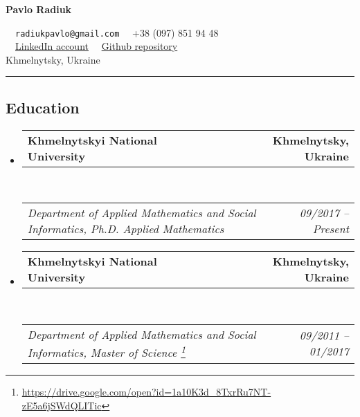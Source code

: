 \documentclass[10pt,letterpaper]{article}
\makeatletter
\newcommand{\headerrow}[2]
{\begin{tabular*}{\linewidth}{l@{\extracolsep{\fill}}r}
	#1 &
	#2 \\
\end{tabular*}}
\makeatother
\begin{document}
\begin{center}
{\LARGE \textbf{Pavlo Radiuk}}

\ \ \texttt{radiukpavlo@gmail.com} \textbullet
\ \ +38 (097) 851 94 48 
\\
\ \ \href{https://www.linkedin.com/in/pavlo-radiuk-487029123/}{LinkedIn account} \textbullet
\ \ \href{https://github.com/soolstafir}{Github repository}
\\
Khmelnytsky, Ukraine
\end{center}


\hrule
\vspace{-0.4em}
\subsection*{Education}

\begin{itemize}
	\parskip=0.1em
	
	\item 
	\headerrow
		{\textbf{Khmelnytskyi National University}}
		{\textbf{Khmelnytsky, Ukraine}}
	\\
	\headerrow
		{\emph{Department of Applied Mathematics and Social 
Informatics, Ph.D. Applied Mathematics}}
		{\emph{09/2017 -- Present}}
	
	
	\item 
	\headerrow
		{\textbf{Khmelnytskyi National University}}
		{\textbf{Khmelnytsky, Ukraine}}
	\\
	\headerrow
		{\emph{Department of Applied Mathematics and Social 
Informatics, Master of Science \footnote{\url{https://drive.google.com/open?id=1a10K3d_8TxrRu7NT-zE5a6jSWdQLITic}}}}
		{\emph{09/2011 -- 01/2017}}
	
	

\end{itemize}
\end{document}
